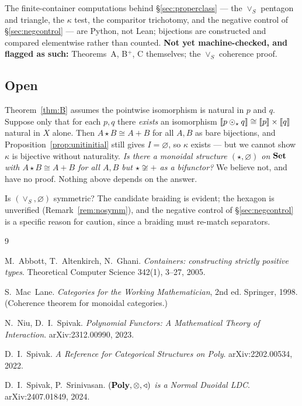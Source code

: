 The finite-container computations behind §\ref{sec:properclass} --- the $\vee_S$
pentagon and triangle, the $\kappa$ test, the comparitor trichotomy, and the
negative control of §\ref{sec:negcontrol} --- are Python, not Lean; bijections are
constructed and compared elementwise rather than counted. \textbf{Not yet
machine-checked, and flagged as such:} Theorems~A, B$^+$, C themselves; the
$\vee_S$ coherence proof.

\subsection*{Open}

\begin{Question}\label{q:naturality}
Theorem~\ref{thm:B} assumes the pointwise isomorphism is natural in $p$ and $q$.
Suppose only that for each $p,q$ there \emph{exists} an isomorphism
$\llbracket p\mathbin{\odot}_\star q \rrbracket\cong\llbracket p \rrbracket\times\llbracket q \rrbracket$ natural in $X$ alone. Then
$A\star B\cong A+B$ for all $A,B$ as bare bijections, and
Proposition~\ref{prop:unitinitial} still gives $I=\varnothing$, so $\kappa$
exists --- but we cannot show $\kappa$ is bijective without naturality. \emph{Is
there a monoidal structure $(\star,\varnothing)$ on $\mathbf{Set}$ with $A\star B\cong
A+B$ for all $A,B$ but $\star\not\cong+$ as a bifunctor?} We believe not, and
have no proof. Nothing above depends on the answer.
\end{Question}

\begin{Question}\label{q:hexagon}
Is $(\vee_S,\varnothing)$ symmetric? The candidate braiding is evident; the
hexagon is unverified (Remark~\ref{rem:nosymm}), and the negative control of
§\ref{sec:negcontrol} is a specific reason for caution, since a braiding must
re-match separators.
\end{Question}

\begin{thebibliography}{9}

 M.~Abbott, T.~Altenkirch, N.~Ghani.
  \emph{Containers: constructing strictly positive types}.
  Theoretical Computer Science 342(1), 3--27, 2005.

 S.~Mac~Lane.
  \emph{Categories for the Working Mathematician}, 2nd ed.
  Springer, 1998. (Coherence theorem for monoidal categories.)

 N.~Niu, D.~I.~Spivak.
  \emph{Polynomial Functors: A Mathematical Theory of Interaction}.
  arXiv:2312.00990, 2023.

 D.~I.~Spivak.
  \emph{A Reference for Categorical Structures on \textup{Poly}}.
  arXiv:2202.00534, 2022.

 D.~I.~Spivak, P.~Srinivasan.
  \emph{$(\mathbf{Poly},\otimes,\triangleleft)$ is a Normal Duoidal LDC}.
  arXiv:2407.01849, 2024.

\end{thebibliography}



